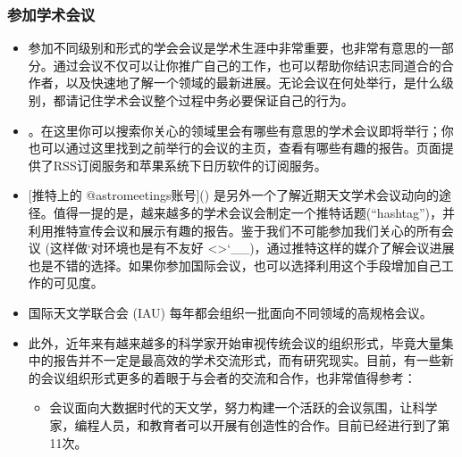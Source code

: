 \documentclass[letterpaper,10pt,english]{sphinxmanual}
\begin{document}
\subsubsection{参加学术会议}
\label{\detokenize{resource/research/getting_started_cn:id21}}\begin{itemize}
\item {} 
参加不同级别和形式的学会会议是学术生涯中非常重要，也非常有意思的一部分。通过会议不仅可以让你推广自己的工作，也可以帮助你结识志同道合的合作者，以及快速地了解一个领域的最新进展。无论会议在何处举行，是什么级别，都请记住学术会议整个过程中务必要保证自己的行为。

\item {} 
。在这里你可以搜索你关心的领域里会有哪些有意思的学术会议即将举行；你也可以通过这里找到之前举行的会议的主页，查看有哪些有趣的报告。页面提供了RSS订阅服务和苹果系统下日历软件的订阅服务。

\item {} 
{[}推特上的
@astromeetings账号{]}()
是另外一个了解近期天文学术会议动向的途径。值得一提的是，越来越多的学术会议会制定一个推特话题(“hashtag”)，并利用推特宣传会议和展示有趣的报告。鉴于我们不可能参加我们关心的所有会议
(这样做{}`对环境也是有不友好 \textless{}\textgreater{}{}`\_\_)，通过推特这样的媒介了解会议进展也是不错的选择。如果你参加国际会议，也可以选择利用这个手段增加自己工作的可见度。

\item {} 
国际天文学联合会 (IAU) 每年都会组织一批面向不同领域的高规格会议。

\item {} 
此外，近年来有越来越多的科学家开始审视传统会议的组织形式，毕竟大量集中的报告并不一定是最高效的学术交流形式，而有研究现实。目前，有一些新的会议组织形式更多的着眼于与会者的交流和合作，也非常值得参考：
\begin{itemize}
\item {} 
会议面向大数据时代的天文学，努力构建一个活跃的会议氛围，让科学家，编程人员，和教育者可以开展有创造性的合作。目前已经进行到了第11次。


\end{itemize}
\end{itemize}
\end{document}
